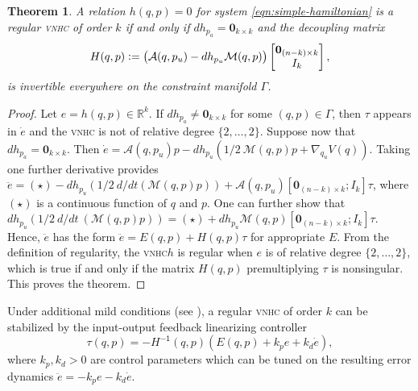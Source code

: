 \documentclass[journal,twoside,web, twocolumn,draftcls]{ieeecolor}
\newtheorem{thm}{Theorem}%
\newcommand*{\inv}{^\mathsf{-1}}
\newcommand*{\R}{\mathbb{R}}
\newcommand*{\Id}[1]{I_{#1}}
\newcommand*{\Zmat}[1]{\bm{0}_{#1}}
\newcommand*{\simpleB}{\begin{bmatrix}\Zmat{(n-k)\times k}\\ \Id{k}\end{bmatrix}}
\newcommand*{\eqdef}{\vcentcolon=}
\newcommand*{\vnhc}{\textsc{vnhc}\xspace}
\begin{document}
\begin{thm}\label{thm:vnhc-regularity}
    A relation \(h(q,p) = 0\) for system \eqref{eqn:simple-hamiltonian}
    is a regular \vnhc of order \(k\) if and only if 
    \(dh_{p_a} = \Zmat{k \times k}\) 
    and the decoupling matrix
    \begin{equation}\label{eqn:decoupling-matrix}
        H(q,p) \eqdef \big(\mathcal{A}(q,p_u) - dh_{p_u}\mathcal{M}(q,p)\big)\simpleB
         ,
     \end{equation}
    is invertible everywhere on the constraint manifold \(\Gamma\).
\end{thm}
\begin{proof}
    Let \(e = h(q,p) \in \R^k\).
    If \(dh_{p_a} \neq \Zmat{k\times k}\) for some \((q,p) \in \Gamma\), 
    then \(\tau\) appears in \(\dot{e}\) and the \vnhc is not of relative degree
    \(\{2,\ldots,2\}\). Suppose now that \(dh_{p_a} = \Zmat{k\times k}\).
    Then 
    \(\dot{e} = \mathcal{A}(q,p_u)p - 
     dh_{p_u}\left(1/2~\mathcal{M}(q,p)p + \nabla_{q_u}V(q)\right)\).
    Taking one further derivative provides
    \( \ddot{e} = (\star) - 
        dh_{p_u}\left(1/2~d/dt\left(\mathcal{M}(q,p)p\right)\right) 
        + \mathcal{A}(q,p_u)[\Zmat{(n-k)\times k};\Id{k}] \tau\),
    where \((\star)\) is a continuous function of \(q\) and \(p\).
    One can further show that
    \(dh_{p_u}\left(1/2~d/dt~\left(\mathcal{M}(q,p)p\right)\right)
        = (\star) + dh_{p_u}\mathcal{M}(q,p)[\Zmat{(n-k)\times k};
        \Id{k}]\tau\).
    Hence, $\ddot e$ has the form \( \ddot{e} = E(q,p) + H(q,p)\tau\) for appropriate \(E\).
    From the definition of regularity, the \vnhc \(h\) is regular 
    when \(e\) is of relative degree \(\{2,\ldots,2\}\), which is true 
    if and only if the matrix $H(q,p)$ premultiplying \(\tau\) is nonsingular. This proves the theorem.
\end{proof}

Under additional mild conditions (see \cite{vhcs_for_el_systems}), a regular \vnhc of
order \(k\) can be stabilized by the input-output feedback linearizing
controller
\begin{equation}\label{eqn:stabilizing-controller}
    \tau(q,p) = -H\inv(q,p)\left(E(q,p) + k_p e + k_d \dot{e}\right)
    ,
\end{equation}
where \(k_p, k_d > 0\) are control parameters which can be tuned on the
resulting error dynamics \(\ddot{e} = -k_p e - k_d \dot{e}\).
\end{document}
